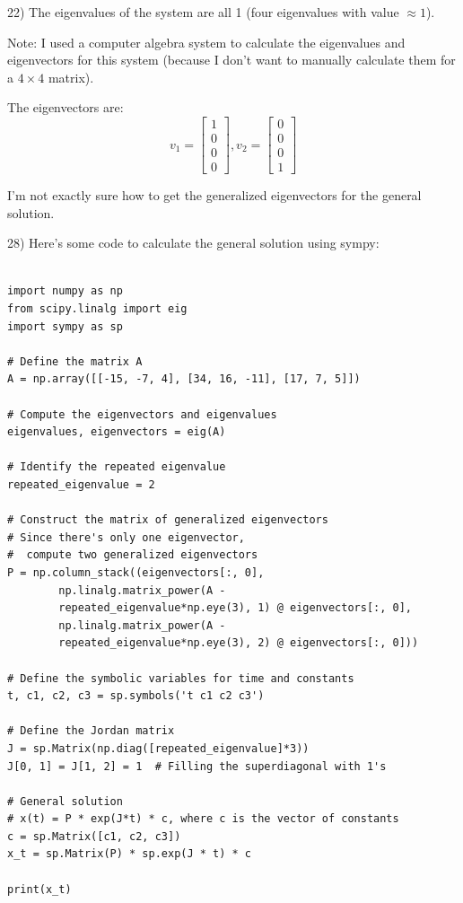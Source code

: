 \documentclass{article}
\begin{document}
22) The eigenvalues of the system are all 1 (four eigenvalues with value $\approx 1$).

Note: I used a computer algebra system to calculate the eigenvalues
and eigenvectors for this system (because I don't want to
manually calculate them for a $4 \times 4$ matrix).

The eigenvectors are:
\[v_1 = \begin{bmatrix}
    1 \\
    0 \\
    0 \\
    0
\end{bmatrix}, v_2 = \begin{bmatrix}
    0 \\
    0 \\
    0 \\
    1
\end{bmatrix}\]

I'm not exactly sure how to get the generalized eigenvectors
for the general solution.


28) Here's some code to calculate the general solution
using sympy:

\begin{lstlisting}

import numpy as np
from scipy.linalg import eig
import sympy as sp

# Define the matrix A
A = np.array([[-15, -7, 4], [34, 16, -11], [17, 7, 5]])

# Compute the eigenvectors and eigenvalues
eigenvalues, eigenvectors = eig(A)

# Identify the repeated eigenvalue
repeated_eigenvalue = 2

# Construct the matrix of generalized eigenvectors
# Since there's only one eigenvector,
#  compute two generalized eigenvectors
P = np.column_stack((eigenvectors[:, 0],
        np.linalg.matrix_power(A -
        repeated_eigenvalue*np.eye(3), 1) @ eigenvectors[:, 0],
        np.linalg.matrix_power(A -
        repeated_eigenvalue*np.eye(3), 2) @ eigenvectors[:, 0]))

# Define the symbolic variables for time and constants
t, c1, c2, c3 = sp.symbols('t c1 c2 c3')

# Define the Jordan matrix
J = sp.Matrix(np.diag([repeated_eigenvalue]*3))
J[0, 1] = J[1, 2] = 1  # Filling the superdiagonal with 1's

# General solution
# x(t) = P * exp(J*t) * c, where c is the vector of constants
c = sp.Matrix([c1, c2, c3])
x_t = sp.Matrix(P) * sp.exp(J * t) * c

print(x_t)

\end{lstlisting}
\end{document}
